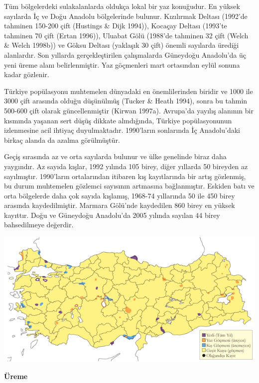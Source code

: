 \documentclass[
  letterpaper,
  DIV=11,
  numbers=noendperiod]{scrreprt}
\begin{document}
Tüm bölgelerdeki sulakalanlarda oldukça lokal bir yaz konuğudur. En
yüksek sayılarda İç ve Doğu Anadolu bölgelerinde bulunur. Kızılırmak
Deltası (1992'de tahminen 150-200 çift (Hustings \& Dijk 1994)), Kocaçay
Deltası (1993'te tahminen 70 çift (Ertan 1996)), Uluabat Gölü (1988'de
tahminen 32 çift (Welch \& Welch 1998b)) ve Göksu Deltası (yaklaşık 30
çift) önemli sayılarda ürediği alanlardır. Son yıllarda gerçekleştirilen
çalışmalarda Güneydoğu Anadolu'da üç yeni üreme alanı belirlenmiştir.
Yaz göçmenleri mart ortasından eylül sonuna kadar gözlenir.

Türkiye popülasyonu muhtemelen dünyadaki en önemlilerinden biridir ve
1000 ile 3000 çift arasında olduğu düşünülmüş (Tucker \& Heath 1994),
sonra bu tahmin 500-600 çift olarak güncellenmiştir (Kirwan 1997a).
Avrupa'da yayılış alanının bir kısmında yaşanan sert düşüş dikkate
alındığında, Türkiye popülasyonunun izlenmesine acil ihtiyaç
duyulmaktadır. 1990'ların sonlarında İç Anadolu'daki birkaç alanda da
azalma görülmüştür.

Geçiş sırasında az ve orta sayılarda bulunur ve ülke genelinde biraz
daha yaygındır. Az sayıda kışlar, 1992 yılında 105 birey, diğer yıllarda
50 bireyden az sayılmıştır. 1990'ların ortalarından itibaren kış
kayıtlarında bir artış gözlenmiş, bu durum muhtemelen gözlemci sayısının
artmasına bağlanmıştır. Eskiden batı ve orta bölgelerde daha çok sayıda
kışlamış, 1968-74 yıllarında 50 ile 450 birey arasında kaydedilmiştir.
Marmara Gölü'nde kaydedilen 860 birey en yüksek kayıttır. Doğu ve
Güneydoğu Anadolu'da 2005 yılında sayılan 44 birey bahsedilmeye
değerdir.

\includegraphics{images/harita_Page_024.png}

\textbf{Üreme}
\end{document}
